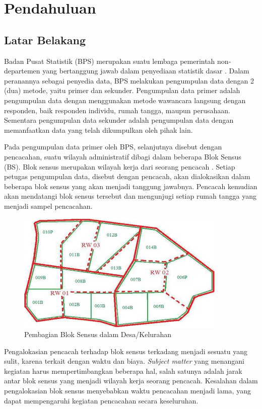 \chapter{Pendahuluan} \label{ch:chapter_1}

\section{Latar Belakang}

Badan Pusat Statistik (BPS) merupakan suatu lembaga pemerintah non-departemen yang bertanggung jawab dalam penyediaan statistik dasar \citep{bps_badan_2016}. Dalam peranannya sebagai penyedia data, BPS melakukan pengumpulan data dengan 2 (dua) metode, yaitu primer dan sekunder. Pengumpulan data primer adalah pengumpulan data dengan menggunakan metode wawancara langsung dengan responden, baik responden individu, rumah tangga, maupun perusahaan. Sementara pengumpulan data sekunder adalah pengumpulan data dengan memanfaatkan data yang telah dikumpulkan oleh pihak lain.


Pada pengumpulan data primer oleh BPS, selanjutnya disebut dengan pencacahan, suatu wilayah administratif dibagi dalam beberapa Blok Sensus (BS). Blok sensus merupakan wilayah kerja dari seorang pencacah \citep{bps_sistem_2016}. Setiap petugas pengumpulan data, disebut dengan pencacah, akan dialokasikan dalam beberapa blok sensus yang akan menjadi tanggung jawabnya. Pencacah kemudian akan mendatangi blok sensus tersebut dan mengunjugi setiap rumah tangga yang menjadi sampel pencacahan.


\begin{figure}[h]
    \centering
    \includegraphics[width=10cm]{../../Resources/Images/peta_kelurahan_per_bs}
    \caption{Pembagian Blok Sensus dalam Desa/Kelurahan}
    \label{fig:capi-ilustration}
\end{figure}


Pengalokasian pencacah terhadap blok sensus terkadang menjadi sesuatu yang sulit, karena terkait dengan waktu dan biaya. \textit{Subject matter} yang menangani kegiatan harus mempertimbangkan beberapa hal, salah satunya adalah jarak antar blok sensus yang menjadi wilayah kerja seorang pencacah. Kesalahan dalam pengalokasian blok sensus menyebabkan waktu pencacahan menjadi lama, yang dapat mempengaruhi kegiatan pencacahan secara keseluruhan.



